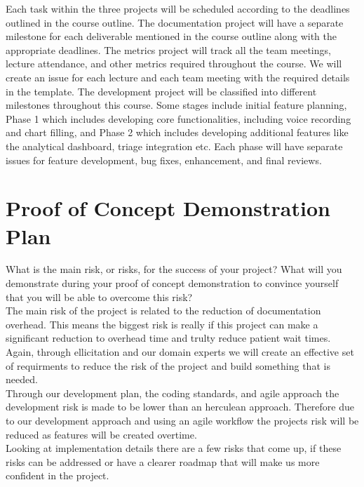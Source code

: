 \documentclass{article}
\begin{document}
Each task within the three projects will be scheduled according to the deadlines outlined in the course outline. The documentation project will have a separate milestone for each deliverable mentioned in the course outline along with the appropriate deadlines. The metrics project will track all the team meetings, lecture attendance, and other metrics required throughout the course. We will create an issue for each lecture and each team meeting with the required details in the template. The development project will be classified into different milestones throughout this course. Some stages include initial feature planning, Phase 1 which includes developing core functionalities, including voice recording and chart filling, and Phase 2 which includes developing additional features like the analytical dashboard, triage integration etc. Each phase will have separate issues for feature development, bug fixes, enhancement, and final reviews. 

\section{Proof of Concept Demonstration Plan}

What is the main risk, or risks, for the success of your project?  What will you
demonstrate during your proof of concept demonstration to convince yourself that
you will be able to overcome this risk?\\

The main risk of the project is related to the reduction of documentation overhead. This means the biggest risk is really if this project can make a significant reduction to overhead time and trulty reduce patient wait times. Again, through ellicitation and our domain experts we will create an effective set of requirments to reduce the risk of the project and build something that is needed.\\

Through our development plan, the coding standards, and agile approach the development risk is made to be lower than an herculean approach. Therefore due to our development approach and using an agile workflow the projects risk will be reduced as features will be created overtime.\\

Looking at implementation details there are a few risks that come up, if these risks can be addressed or have a clearer roadmap that will make us more confident in the project. 
\end{document}
